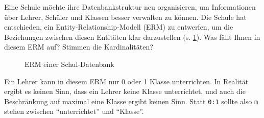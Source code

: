 \begin{myexercise}
  Eine Schule möchte ihre Datenbankstruktur neu organisieren, um Informationen über Lehrer, Schüler und Klassen besser verwalten zu können. Die Schule hat entschieden, ein Entity-Relationship-Modell (ERM) zu entwerfen, um die Beziehungen zwischen diesen Entitäten klar darzustellen (s. \cref{fig:erm-school}). Was fällt Ihnen in diesem \gls{ERM} auf? Stimmen die Kardinalitäten?
  \begin{figure}[H]
    \centering

    \caption{\gls{ERM} einer Schul-Datenbank}
    \label{fig:erm-school}
  \end{figure}

  \begin{myanswer}
    Ein Lehrer kann in diesem \gls{ERM} nur 0 oder 1 Klasse unterrichten. In Realität ergibt es keinen Sinn, dass ein Lehrer keine Klasse unterrichtet, und auch die Beschränkung auf maximal eine Klasse ergibt keinen Sinn. Statt \texttt{0:1} sollte also \texttt{m} stehen zwischen ``unterrichtet'' und ``Klasse''.
  \end{myanswer}
\end{myexercise}

